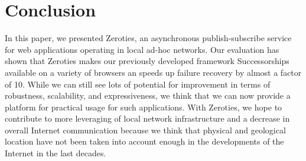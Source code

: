 \section{Conclusion}
\label{sec:conclusion}

In this paper, we presented Zeroties, an asynchronous publish-subscribe service for web applications operating in local ad-hoc networks. 
Our evaluation has shown that Zeroties makes our previously developed framework Successorships available on a variety of browsers an speeds up failure recovery by almost a factor of 10.
While we can still see lots of potential for improvement in terms of robustness, scalability, and expressiveness, we think that we can now provide a platform for practical usage for such applications.
With Zeroties, we hope to contribute to more leveraging of local network infrastructure and a decrease in overall Internet communication because we think that physical and geological location have not been taken into account enough in the developments of the Internet in the last decades.
